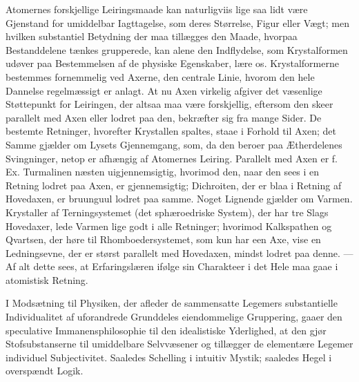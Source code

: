 \documentclass[12pt,a4paper]{book}
\begin{document}
Atomernes forskjellige Leiringsmaade kan naturligviis lige saa lidt
være Gjenstand for umiddelbar Iagttagelse, som deres Størrelse, Figur
eller Vægt; men hvilken substantiel Betydning der maa tillægges den
Maade, hvorpaa Bestanddelene tænkes grupperede, kan alene den
Indflydelse, som Krystalformen udøver paa Bestemmelsen af de physiske
Egenskaber, lære os. Krystalformerne bestemmes fornemmelig ved
Axerne, den centrale Linie, hvorom den hele Dannelse regelmæssigt er
anlagt. At nu Axen virkelig afgiver det væsenlige Støttepunkt for
Leiringen, der altsaa maa være forskjellig, eftersom den skeer
parallelt med Axen eller lodret paa den, bekræfter sig fra mange
Sider. De bestemte Retninger, hvorefter Krystallen spaltes, staae i
Forhold til Axen; det Samme gjælder om Lysets Gjennemgang, som, da den
beroer paa Ætherdelenes Svingninger, netop er afhængig af
Atomernes Leiring. Parallelt med Axen er f. Ex. Turmalinen næsten
uigjennemsigtig, hvorimod den, naar den sees i en Retning lodret paa
Axen, er gjennemsigtig; Dichroiten, der er blaa i Retning af
Hovedaxen, er bruunguul lodret paa samme. Noget Lignende gjælder om
Varmen. Krystaller af Terningsystemet (det sphæroedriske System), der
har tre Slags Hovedaxer, lede Varmen lige godt i alle Retninger;
hvorimod Kalkspathen og Qvartsen, der høre til Rhomboedersystemet, som
kun har een Axe, vise en Ledningsevne, der er størst parallelt med
Hovedaxen, mindst lodret paa denne. --- Af alt dette sees, at
Erfaringslæren ifølge sin Charakteer i det Hele maa gaae i atomistisk
Retning.

I Modsætning til Physiken, der afleder de sammensatte Legemers
substantielle Individualitet af uforandrede Grunddeles eiendommelige
Gruppering, gaaer den speculative Immanensphilosophie til den
idealistiske Yderlighed, at den gjør Stofsubstanserne til umiddelbare
Selvvæsener og tillægger de elementære Legemer individuel
Subjectivitet. Saaledes Schelling i intuitiv Mystik; saaledes Hegel i
overspændt Logik.
\end{document}

